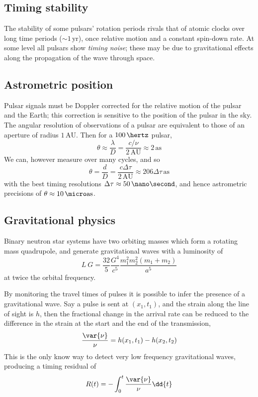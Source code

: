 \subsection{Timing stability}
\label{sec:timing-stability}

The stability of some pulsars' rotation periods rivals that of atomic
clocks over long time periods ($\sim 1\,\text{yr}$), once relative
motion and a constant spin-down rate. At some level all pulsars show
\emph{timing noise}; these may be due to gravitational effects along
the propagation of the wave through space.

\subsection{Astrometric position}
\label{sec:astrometric-position}

Pulsar signals must be Doppler corrected for the relative motion of
the pulsar and the Earth; this correction is sensitive to the position
of the pulsar in the sky. The angular resolution of observations of a
pulsar are equivalent to those of an aperture of radius
$1\,\text{AU}$. Then for a $100\,\hertz$ pulsar,
\[\theta \approx \frac{\lambda}{D} = \frac{c/\nu}{2\,\text{AU}} \approx 2\,\text{as}\]
We can, however measure over many cycles, and so
\[ \theta = \frac{d}{D} = \frac{c \Delta \tau}{2\,\text{AU}} \approx
206 \Delta \tau\,\text{as} \] with the best timing resolutions $\Delta
\tau \approx 50\,\nano\second$, and hence astrometric precisions of
$\theta \approx 10\,\micro\text{as}$.

\subsection{Gravitational physics}
\label{sec:grav-phys}

Binary neutron star systems have two orbiting masses which form a
rotating mass quadrupole, and generate gravitational waves with a
luminosity of
\begin{equation}
  \label{eq:97}
  L~G = \frac{32}{5} \frac{G^4}{c^5} \frac{m_1^2 m_2^2 (m_1+m_2)}{a^5}
\end{equation}
at twice the orbital frequency.

By monitoring the travel times of pulses it is possible to infer the
presence of a gravitational wave. Say a pulse is sent at $(x_1,t_1)$,
and the strain along the line of sight is $h$, then the fractional
change in the arrival rate can be reduced to the difference in the
strain at the start and the end of the transmission,
\begin{equation}
  \label{eq:98}
  \frac{\var{\nu}}{\nu} = h(x_1,t_1) - h(x_2, t_2) 
\end{equation}
This is the only know way to detect very low frequency gravitational
waves, producing a timing residual of
\begin{equation}
  \label{eq:99}
  R(t) = - \int_0^t \frac{\var{\nu}}{\nu} \dd{t}
\end{equation}

